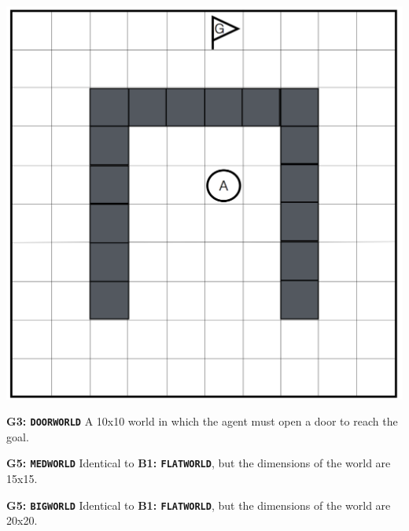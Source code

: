 \documentclass[]{article}
\begin{document}
\begin{center}
\includegraphics[scale=0.21]{figures/uwall.png}
\end{center}

{\bf G3: \texttt{DOORWORLD}} A 10x10 world in which the agent must open a door to reach the goal.



%




{\bf G5: \texttt{MEDWORLD}} Identical to {\bf B1: \texttt{FLATWORLD}}, but the dimensions of the world are 15x15.


{\bf G5: \texttt{BIGWORLD}} Identical to {\bf B1: \texttt{FLATWORLD}}, but the dimensions of the world are 20x20.



%
\end{document}

